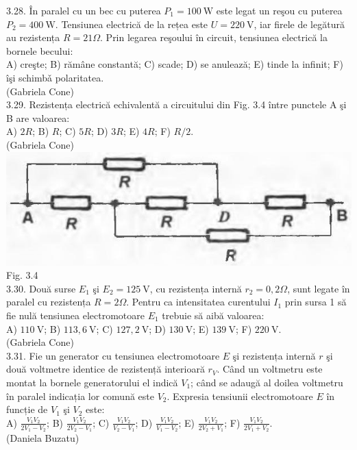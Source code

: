 3.28. În paralel cu un bec cu puterea $P_{1}=100 \mathrm{~W}$ este legat un reşou cu puterea $P_{2}=400 \mathrm{~W}$. Tensiunea electrică de la rețea este $U=220 \mathrm{~V}$, iar firele de legătură au rezistența $R=21 \Omega$. Prin legarea reşoului în circuit, tensiunea electrică la bornele becului:\\ A) creşte; B) rămâne constantă; C) scade; D) se anulează; E) tinde la infinit; F) îşi schimbǎ polaritatea.\\ (Gabriela Cone)\\

3.29. Rezistența electrică echivalentă a circuitului din Fig. 3.4 între punctele A şi B are valoarea:\\ A) $2 R$; B) $R$; C) $5 R$; D) $3 R$; E) $4 R$; F) $R / 2$.\\ (Gabriela Cone)\\ \includegraphics[width=0.4\linewidth]{images/2025_07_01_5b3ff9fa0d508c8e9f17g-149} Fig. 3.4\\

3.30. Două surse $E_{1}$ şi $E_{2}=125 \mathrm{~V}$, cu rezistența internă $r_{2}=0,2 \Omega$, sunt legate în paralel cu rezistența $R=2 \Omega$. Pentru ca intensitatea curentului $I_{1}$ prin sursa 1 să fie nulă tensiunea electromotoare $E_{1}$ trebuie să aibă valoarea:\\ A) $110 \mathrm{~V}$; B) $113,6 \mathrm{~V}$; C) $127,2 \mathrm{~V}$; D) $130 \mathrm{~V}$; E) $139 \mathrm{~V}$; F) $220 \mathrm{~V}$.\\ (Gabriela Cone)\\

3.31. Fie un generator cu tensiunea electromotoare $E$ şi rezistența internă $r$ şi două voltmetre identice de rezistență interioară $r_{V}$. Când un voltmetru este montat la bornele generatorului el indică $V_{1}$; când se adaugă al doilea voltmetru în paralel indicația lor comună este $V_{2}$. Expresia tensiunii electromotoare $E$ în funcție de $V_{1}$ şi $V_{2}$ este:\\ A) $\frac{V_{1} V_{2}}{2 V_{1}-V_{2}}$; B) $\frac{V_{1} V_{2}}{2 V_{2}-V_{1}}$; C) $\frac{V_{1} V_{2}}{V_{2}-V_{1}}$; D) $\frac{V_{1} V_{2}}{V_{1}-V_{2}}$; E) $\frac{V_{1} V_{2}}{2 V_{2}+V_{1}}$; F) $\frac{V_{1} V_{2}}{2 V_{1}+V_{2}}$.\\ (Daniela Buzatu)\\

